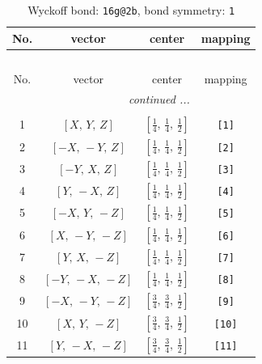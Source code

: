 \documentclass[fleqn,8pt]{jsarticle}
\begin{document}
\begin{longtable}{cccc}
\caption{Wyckoff bond: {\tt 16g@2b}, bond symmetry: {\tt 1}}
 \\
 \hline \hline
No. & vector & center & mapping \\ \hline \endfirsthead

\multicolumn{3}{l}{\tablename\ \thetable{}} \\
 \hline \hline
No. & vector & center & mapping \\ \hline \endhead

 \hline \hline
\multicolumn{3}{r}{\footnotesize\it continued ...} \\ \endfoot

 \hline \hline
\multicolumn{3}{r}{} \\ \endlastfoot

1 & $\left[ X,\, Y,\, Z \right]$ & $\left[ \frac{1}{4},\, \frac{1}{4},\, \frac{1}{2} \right]$ & {\tt [1]} \\ \hline
2 & $\left[ - X,\, - Y,\, Z \right]$ & $\left[ \frac{1}{4},\, \frac{1}{4},\, \frac{1}{2} \right]$ & {\tt [2]} \\ \hline
3 & $\left[ - Y,\, X,\, Z \right]$ & $\left[ \frac{1}{4},\, \frac{1}{4},\, \frac{1}{2} \right]$ & {\tt [3]} \\ \hline
4 & $\left[ Y,\, - X,\, Z \right]$ & $\left[ \frac{1}{4},\, \frac{1}{4},\, \frac{1}{2} \right]$ & {\tt [4]} \\ \hline
5 & $\left[ - X,\, Y,\, - Z \right]$ & $\left[ \frac{1}{4},\, \frac{1}{4},\, \frac{1}{2} \right]$ & {\tt [5]} \\ \hline
6 & $\left[ X,\, - Y,\, - Z \right]$ & $\left[ \frac{1}{4},\, \frac{1}{4},\, \frac{1}{2} \right]$ & {\tt [6]} \\ \hline
7 & $\left[ Y,\, X,\, - Z \right]$ & $\left[ \frac{1}{4},\, \frac{1}{4},\, \frac{1}{2} \right]$ & {\tt [7]} \\ \hline
8 & $\left[ - Y,\, - X,\, - Z \right]$ & $\left[ \frac{1}{4},\, \frac{1}{4},\, \frac{1}{2} \right]$ & {\tt [8]} \\ \hline
9 & $\left[ - X,\, - Y,\, - Z \right]$ & $\left[ \frac{3}{4},\, \frac{3}{4},\, \frac{1}{2} \right]$ & {\tt [9]} \\ \hline
10 & $\left[ X,\, Y,\, - Z \right]$ & $\left[ \frac{3}{4},\, \frac{3}{4},\, \frac{1}{2} \right]$ & {\tt [10]} \\ \hline
11 & $\left[ Y,\, - X,\, - Z \right]$ & $\left[ \frac{3}{4},\, \frac{3}{4},\, \frac{1}{2} \right]$ & {\tt [11]} \\ \hline

\end{longtable}
\end{document}
